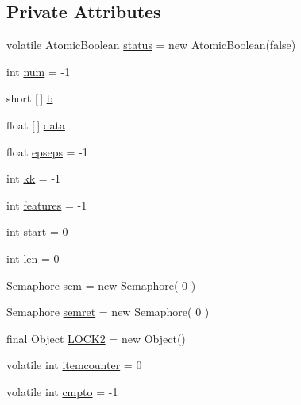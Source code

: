 \subsection*{Private Attributes}
\begin{DoxyCompactItemize}
\item 
volatile Atomic\+Boolean \mbox{\hyperlink{classcom_1_1example_1_1dmocl_1_1dbscan_1_1dbscan__thread1_a011b2e61c857911aaf4512eae0275d15}{status}} = new Atomic\+Boolean(false)
\item 
int \mbox{\hyperlink{classcom_1_1example_1_1dmocl_1_1dbscan_1_1dbscan__thread1_a95a0e173c6c23bd5d1416aa9d207742d}{num}} = -\/1
\item 
short \mbox{[}$\,$\mbox{]} \mbox{\hyperlink{classcom_1_1example_1_1dmocl_1_1dbscan_1_1dbscan__thread1_a9a6c463653789946e1e679443fffb75a}{b}}
\item 
float \mbox{[}$\,$\mbox{]} \mbox{\hyperlink{classcom_1_1example_1_1dmocl_1_1dbscan_1_1dbscan__thread1_aa9e76d2e3d9ecbf0524c4d8a80471e57}{data}}
\item 
float \mbox{\hyperlink{classcom_1_1example_1_1dmocl_1_1dbscan_1_1dbscan__thread1_ace39ecc18d0d9f0a9c641e31c5f97959}{epseps}} = -\/1
\item 
int \mbox{\hyperlink{classcom_1_1example_1_1dmocl_1_1dbscan_1_1dbscan__thread1_a047fd3ab03cf3ddab9317d2004cce994}{kk}} = -\/1
\item 
int \mbox{\hyperlink{classcom_1_1example_1_1dmocl_1_1dbscan_1_1dbscan__thread1_a00a9a411e64b2875f0e465417eab70cd}{features}} = -\/1
\item 
int \mbox{\hyperlink{classcom_1_1example_1_1dmocl_1_1dbscan_1_1dbscan__thread1_ae4fb416661cfe005e777b5a23ec260bf}{start}} = 0
\item 
int \mbox{\hyperlink{classcom_1_1example_1_1dmocl_1_1dbscan_1_1dbscan__thread1_ab232593fdc3e759215370c8a7b5b4809}{len}} = 0
\item 
Semaphore \mbox{\hyperlink{classcom_1_1example_1_1dmocl_1_1dbscan_1_1dbscan__thread1_ae33687a1a94acd83aefab2755219df12}{sem}} = new Semaphore( 0 )
\item 
Semaphore \mbox{\hyperlink{classcom_1_1example_1_1dmocl_1_1dbscan_1_1dbscan__thread1_a1dcb7041561213e946b1d43fa787c179}{semret}} = new Semaphore( 0 )
\item 
final Object \mbox{\hyperlink{classcom_1_1example_1_1dmocl_1_1dbscan_1_1dbscan__thread1_a0a544c55ce1cb6eaff0d74bc5bd0b706}{L\+O\+C\+K2}} = new Object()
\item 
volatile int \mbox{\hyperlink{classcom_1_1example_1_1dmocl_1_1dbscan_1_1dbscan__thread1_a5167ad4080dbb2e660abb2ed6ec751c0}{itemcounter}} = 0
\item 
volatile int \mbox{\hyperlink{classcom_1_1example_1_1dmocl_1_1dbscan_1_1dbscan__thread1_a126ae0f0fb657d8bed0514a83f47b8c4}{cmpto}} = -\/1
\end{DoxyCompactItemize}


